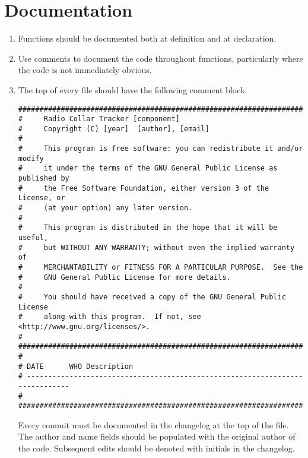 \documentclass{article}
\begin{document}
\section{Documentation}
\begin{enumerate}
    \item Functions should be documented both at definition and at declaration.
    \item Use comments to document the code throughout functions, particularly where the code is not immediately obvious.
    \item The top of every file should have the following comment block:
\begin{lstlisting}
###############################################################################
#     Radio Collar Tracker [component]
#     Copyright (C) [year]  [author], [email]
#
#     This program is free software: you can redistribute it and/or modify
#     it under the terms of the GNU General Public License as published by
#     the Free Software Foundation, either version 3 of the License, or
#     (at your option) any later version.
#
#     This program is distributed in the hope that it will be useful,
#     but WITHOUT ANY WARRANTY; without even the implied warranty of
#     MERCHANTABILITY or FITNESS FOR A PARTICULAR PURPOSE.  See the
#     GNU General Public License for more details.
#
#     You should have received a copy of the GNU General Public License
#     along with this program.  If not, see <http://www.gnu.org/licenses/>.
#
###############################################################################
#
# DATE      WHO Description
# -----------------------------------------------------------------------------
#
###############################################################################
\end{lstlisting}

    Every commit must be documented in the changelog at the top of the file.  The author and name fields should be populated with the original author of the code.  Subsequent edits should be denoted with initials in the changelog.

\end{enumerate}
\end{document}
